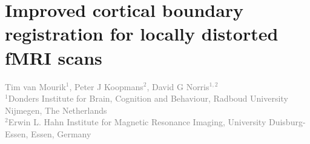 
\chapter{Improved cortical boundary registration for locally distorted fMRI scans}
\label{ch:registration}

\textcolor{gray}{{Tim van Mourik$^{1}$}, Peter J Koopmans$^{2}$, David G Norris$^{1,2}$\\
$^{1}$Donders Institute for Brain, Cognition and Behaviour, Radboud University Nijmegen, The Netherlands\\
$^{2}$Erwin L. Hahn Institute for Magnetic Resonance Imaging, University Duisburg-Essen, Essen, Germany}\\

\linespread{1.5}
\newpage







